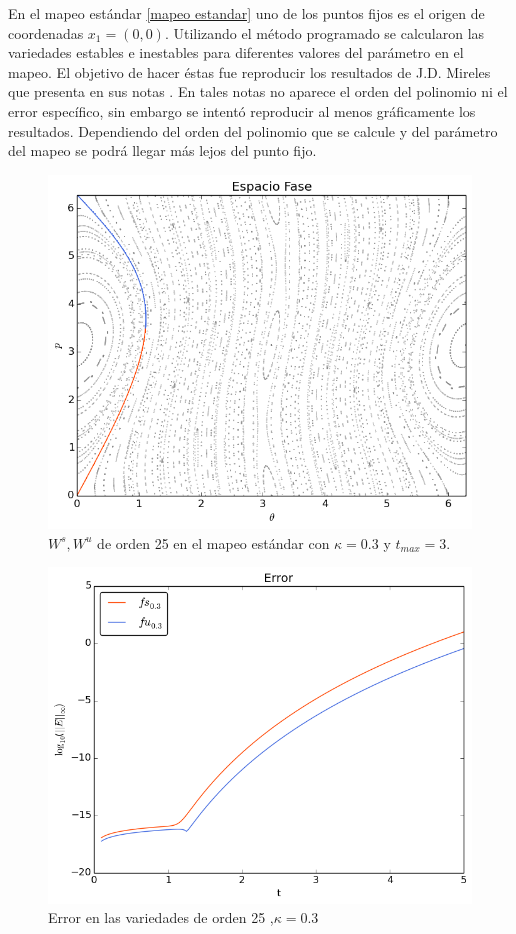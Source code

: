 En el mapeo estándar \ref{mapeo estandar} uno de los puntos fijos es el origen de coordenadas $x_{1}=(0,0)$. Utilizando el método programado se calcularon las variedades estables e inestables para diferentes valores del parámetro en el mapeo. El objetivo de hacer éstas fue reproducir los resultados de J.D. Mireles que presenta en sus notas \cite{Mireles}. En tales notas no aparece el orden del polinomio ni el error específico, sin embargo se intentó reproducir al menos gráficamente los resultados. Dependiendo del orden del polinomio que se calcule y del parámetro del mapeo se podrá llegar más lejos del punto fijo.  
\begin{figure}[H]
 \centering
 \includegraphics[scale=0.6]{estandark03}
 \caption{$W^{s},W^{u}$ de orden 25 en el mapeo estándar con $\kappa=0.3$ y $t_{max}=3.$}
 \label{estandar03}
\end{figure}

\begin{figure}[H]
\centering
\includegraphics[scale=0.6]{error_est_k03} 
\caption{Error en las variedades de orden 25 ,$\kappa=0.3$}
\label{error est k03}
\end{figure}




